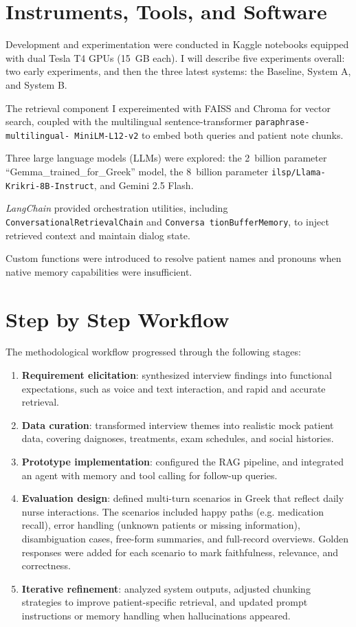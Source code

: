 \section{Instruments, Tools, and Software}
Development and experimentation were conducted in Kaggle notebooks equipped with dual Tesla T4 GPUs (15~GB each). I will describe five experiments overall: two early experiments, and then the three latest systems: the Baseline, System A, and System B. 

The retrieval component I expereimented with FAISS and Chroma for vector search, coupled with the multilingual sentence-transformer \texttt{paraphrase-multilingual- MiniLM-L12-v2} to embed both queries and patient note chunks. 

Three large language models (LLMs) were explored: the 2~billion parameter ``Gemma\_trained\_for\_Greek'' model, the 8~billion parameter \texttt{ilsp/Llama-Krikri-8B-Instruct}, and Gemini 2.5 Flash. 

\textit{LangChain} provided orchestration utilities, including \texttt{ConversationalRetrievalChain} and \texttt{Conversa
tionBufferMemory}, to inject retrieved context and maintain dialog state. 

Custom functions were introduced to resolve patient names and pronouns when native memory capabilities were insufficient.

\section{Step by Step Workflow}
The methodological workflow progressed through the following stages:
\begin{enumerate}
    \item \textbf{Requirement elicitation}: synthesized interview findings into functional expectations, such as voice and text interaction, and rapid and accurate retrieval.
    \item \textbf{Data curation}: transformed interview themes into realistic mock patient data, covering  daignoses, treatments, exam schedules, and social histories.
    \item \textbf{Prototype implementation}: configured the RAG pipeline, and integrated an agent with memory and tool calling for follow-up queries.
    \item \textbf{Evaluation design}: defined multi-turn scenarios in Greek that reflect daily nurse interactions. The scenarios included happy paths (e.g. medication recall), error handling (unknown patients or missing information), disambiguation cases, free-form summaries, and full-record overviews. Golden responses were added for each scenario to mark faithfulness, relevance, and correctness.
    \item \textbf{Iterative refinement}: analyzed system outputs, adjusted chunking strategies to improve patient-specific retrieval, and updated prompt instructions or memory handling when hallucinations appeared.
\end{enumerate}


